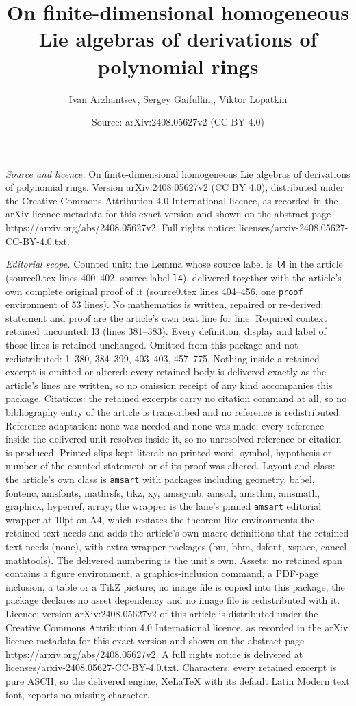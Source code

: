 \documentclass[10pt,a4paper]{amsart}
\title[On finite-dimensional homogeneous Lie algebras of derivation]{On finite-dimensional homogeneous Lie algebras of derivations of polynomial rings}
\author{Ivan Arzhantsev, Sergey Gaifullin,, Viktor Lopatkin}
\date{Source: arXiv:2408.05627v2 (CC BY 4.0)}
\begin{document}
\maketitle

\noindent\emph{Source and licence.} On finite-dimensional homogeneous Lie algebras of derivations of polynomial rings. Version arXiv:2408.05627v2 (CC BY 4.0), distributed under the Creative Commons Attribution 4.0 International licence, as recorded in the arXiv licence metadata for this exact version and shown on the abstract page https://arxiv.org/abs/2408.05627v2. Full rights notice: licenses/arxiv-2408.05627-CC-BY-4.0.txt.\par\smallskip

\noindent\textit{Editorial scope.} Counted unit: the Lemma whose source label is \texttt{l4} in the article (source0.tex lines 400--402, source label \texttt{l4}), delivered together with the article's own complete original proof of it (source0.tex lines 404--456, one \texttt{proof} environment of 53 lines). No mathematics is written, repaired or re-derived: statement and proof are the article's own text line for line. Required context retained uncounted: l3 (lines 381--383). Every definition, display and label of those lines is retained unchanged. Omitted from this package and not redistributed: 1--380, 384--399, 403--403, 457--775. Nothing inside a retained excerpt is omitted or altered: every retained body is delivered exactly as the article's lines are written, so no omission receipt of any kind accompanies this package. Citations: the retained excerpts carry no citation command at all, so no bibliography entry of the article is transcribed and no reference is redistributed. Reference adaptation: none was needed and none was made; every reference inside the delivered unit resolves inside it, so no unresolved reference or citation is produced. Printed slips kept literal: no printed word, symbol, hypothesis or number of the counted statement or of its proof was altered. Layout and class: the article's own class is \texttt{amsart} with packages including geometry, babel, fontenc, amsfonts, mathrsfs, tikz, xy, amssymb, amscd, amsthm, amsmath, graphicx, hyperref, array; the wrapper is the lane's pinned \texttt{amsart} editorial wrapper at 10pt on A4, which restates the theorem-like environments the retained text needs and adds the article's own macro definitions that the retained text needs (none), with extra wrapper packages (bm, bbm, dsfont, xspace, cancel, mathtools). The delivered numbering is the unit's own. Assets: no retained span contains a figure environment, a graphics-inclusion command, a PDF-page inclusion, a table or a TikZ picture; no image file is copied into this package, the package declares no asset dependency and no image file is redistributed with it. Licence: version arXiv:2408.05627v2 of this article is distributed under the Creative Commons Attribution 4.0 International licence, as recorded in the arXiv licence metadata for this exact version and shown on the abstract page https://arxiv.org/abs/2408.05627v2. A full rights notice is delivered at licenses/arxiv-2408.05627-CC-BY-4.0.txt. Characters: every retained excerpt is pure ASCII, so the delivered engine, XeLaTeX with its default Latin Modern text font, reports no missing character.
\end{document}
